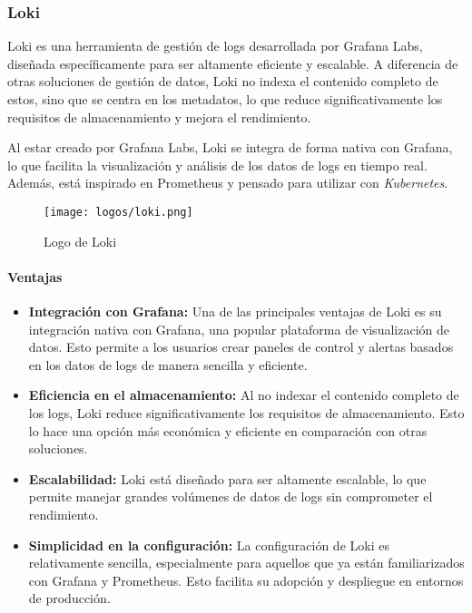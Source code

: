 \newpage{}
\subsubsection{Loki}
Loki es una herramienta de gestión de logs desarrollada por Grafana Labs,
diseñada específicamente para ser altamente eficiente y escalable. A diferencia
de otras soluciones de gestión de datos, Loki no indexa el contenido completo de
estos, sino que se centra en los metadatos, lo que reduce significativamente
los requisitos de almacenamiento y mejora el rendimiento.

Al estar creado por Grafana Labs, Loki se integra de forma nativa con Grafana,
lo que facilita la visualización y análisis de los datos de logs en tiempo real.
Además, está inspirado en Prometheus y pensado para utilizar con
\textit{Kubernetes}.

\begin{figure}[H]
	\centering
	\texttt{[image: logos/loki.png]}
	\caption{Logo de Loki~\textregistered}
\end{figure}

\paragraph{Ventajas}
\begin{itemize}
    \item \textbf{Integración con Grafana:} Una de las principales ventajas de
		Loki es su integración nativa con Grafana, una popular plataforma de
		visualización de datos. Esto permite a los usuarios crear paneles de
		control y alertas basados en los datos de logs de manera sencilla y
		eficiente.
    \item \textbf{Eficiencia en el almacenamiento:} Al no indexar el contenido
		completo de los logs, Loki reduce significativamente los requisitos de
		almacenamiento. Esto lo hace una opción más económica y eficiente en
		comparación con otras soluciones.
    \item \textbf{Escalabilidad:} Loki está diseñado para ser altamente
		escalable, lo que permite manejar grandes volúmenes de datos de logs sin
		comprometer el rendimiento.
    \item \textbf{Simplicidad en la configuración:} La configuración de Loki es
		relativamente sencilla, especialmente para aquellos que ya están
		familiarizados con Grafana y Prometheus. Esto facilita su adopción y
		despliegue en entornos de producción.
\end{itemize}


